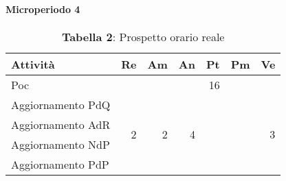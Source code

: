 \paragraph{Microperiodo 4}
\begin{table}[H]
	\centering
	\begin{tabular}{|l|r|r|r|l|l|r|}
		\hline
		\rowcolor{lighter-grayer}
		\textbf{Attività} & \multicolumn{1}{l|}{\textbf{Re}} & \multicolumn{1}{l|}{\textbf{Am}} & \multicolumn{1}{l|}{\textbf{An}} & \textbf{Pt}             & \textbf{Pm} & \multicolumn{1}{l|}{\textbf{Ve}} \\ \hline
		Poc               & \multicolumn{1}{l|}{}            & \multicolumn{1}{l|}{}            & \multicolumn{1}{l|}{}            & \multicolumn{1}{r|}{16} &             & \multicolumn{1}{l|}{}            \\ \hline
		Aggiornamento PdQ & \multirow{4}{*}{2}               & \multirow{4}{*}{2}               & \multirow{4}{*}{4}               &                         &             & \multirow{4}{*}{3}               \\ \cline{1-1} \cline{5-6}
		Aggiornamento AdR &                                  &                                  &                                  &                         &             &                                  \\ \cline{1-1} \cline{5-6}
		Aggiornamento NdP &                                  &                                  &                                  &                         &             &                                  \\ \cline{1-1} \cline{5-6}
		Aggiornamento PdP &                                  &                                  &                                  &                         &             &                                  \\ \hline
	\end{tabular}
\caption*{\textbf{Tabella 2}: Prospetto orario reale\\}
\end{table}

